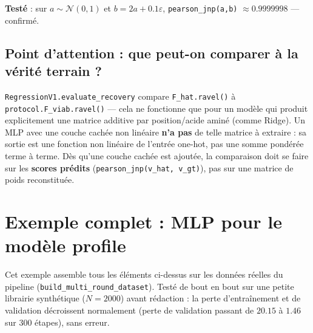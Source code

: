 \documentclass[11pt,a4paper]{article}
\begin{document}
\begin{mdframed}
\textbf{Testé} : sur $a \sim \mathcal{N}(0,1)$ et $b = 2a + 0.1\varepsilon$,
\texttt{pearson\_jnp(a,b)} $\approx 0.9999998$ --- confirmé.
\end{mdframed}

\subsection{Point d'attention : que peut-on comparer à la vérité terrain ?}
\texttt{RegressionV1.evaluate\_recovery} compare \texttt{F\_hat.ravel()} à
\texttt{protocol.F\_viab.ravel()} --- cela ne fonctionne que pour un modèle
qui produit explicitement une matrice additive par position/acide aminé
(comme Ridge). Un MLP avec une couche cachée non linéaire \textbf{n'a pas} de
telle matrice à extraire : sa sortie est une fonction non linéaire de
l'entrée one-hot, pas une somme pondérée terme à terme. Dès qu'une couche
cachée est ajoutée, la comparaison doit se faire sur les \textbf{scores
prédits} (\texttt{pearson\_jnp(v\_hat, v\_gt)}), pas sur une matrice de
poids reconstituée.

\section{Exemple complet : MLP pour le modèle profile}

Cet exemple assemble tous les éléments ci-dessus sur les données réelles du
pipeline (\texttt{build\_multi\_round\_dataset}). Testé de bout en bout sur
une petite librairie synthétique ($N{=}2000$) avant rédaction : la perte
d'entraînement et de validation décroissent normalement (perte de validation
passant de $20.15$ à $1.46$ sur 300 étapes), sans erreur.
\end{document}
